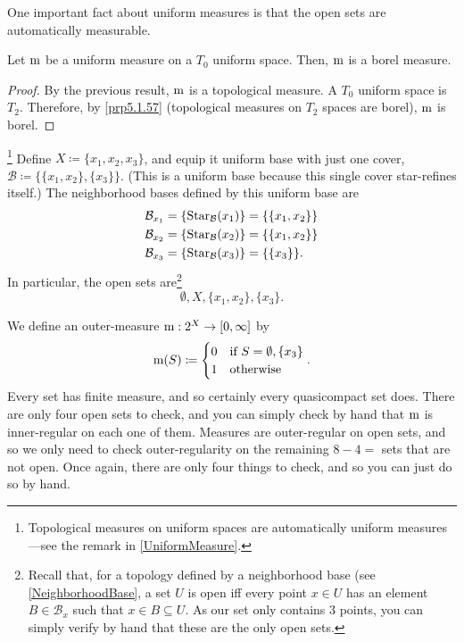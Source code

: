 One important fact about uniform measures is that the open sets are automatically measurable.
\begin{prp}\label{prp5.1.25}
Let $\mathrm{m}$ be a uniform measure on a $T_0$ uniform space.  Then, $\mathrm{m}$ is a borel measure.
\begin{proof}
By the previous result, $\mathrm{m}$ is a topological measure.  A $T_0$ uniform space is $T_2$.  Therefore, by \cref{prp5.1.57} (topological measures on $T_2$ spaces are borel), $\mathrm{m}$ is borel.
\end{proof}
\end{prp}
\begin{exm}\footnote{Topological measures on uniform spaces are automatically uniform measures---see the remark in \cref{UniformMeasure}.}\label{exm5.1.43}
Define $X\coloneqq \{ x_1,x_2,x_3\}$, and equip it uniform base with just one cover, $\mathcal{B}\coloneqq \{ \{ x_1,x_2\} ,\{ x_3\} \}$.  (This is a uniform base because this single cover star-refines itself.)  The neighborhood bases defined by this uniform base are
\begin{equation}
\begin{split}
\mathcal{B}_{x_1} & =\{ \operatorname{Star} _{\mathcal{B}}(x_1)\} =\{ \{ x_1,x_2\} \} \\
\mathcal{B}_{x_2} & =\{ \operatorname{Star} _{\mathcal{B}}(x_2)\} =\{ \{ x_1,x_2\} \} \\
\mathcal{B}_{x_3} & =\{ \operatorname{Star} _{\mathcal{B}}(x_3)\} =\{ \{ x_3\} \} .
\end{split}
\end{equation}
In particular, the open sets are\footnote{Recall that, for a topology defined by a neighborhood base (see \cref{NeighborhoodBase}, a set $U$ is open iff every point $x\in U$ has an element $B\in \mathcal{B}_x$ such that $x\in B\subseteq U$.  As our set only contains $3$ points, you can simply verify by hand that these are the only open sets.}
\begin{equation}
\emptyset ,X,\{ x_1,x_2\} ,\{ x_3\} .
\end{equation}

We define an outer-measure $\mathrm{m} :2^X\rightarrow [0,\infty ]$ by
\begin{equation}
\mathrm{m} (S)\coloneqq \begin{cases}0 & \text{if }S=\emptyset ,\{ x_3\} \\ 1 & \text{otherwise}\end{cases}.
\end{equation}
Every set has finite measure, and so certainly every quasicompact set does.  There are only four open sets to check, and you can simply check by hand that $\mathrm{m}$ is inner-regular on each one of them.  Measures are outer-regular on open sets, and so we only need to check outer-regularity on the remaining $8-4=$ sets that are not open.  Once again, there are only four things to check, and so you can just do so by hand.


\end{exm}
